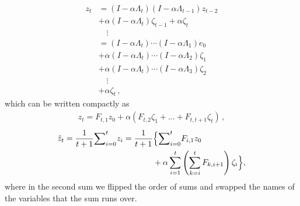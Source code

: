\begin{align*}
z_t
& = (I-\alpha \Lambda_t) (I-\alpha \Lambda_{t-1}) z_{t-2}\\ &+ \alpha (I-\alpha \Lambda_t) \zeta_{t-1} +\alpha \zeta_t \\
& \quad \vdots\\
& = (I-\alpha \Lambda_t) \cdots (I-\alpha \Lambda_1) e_0\\ &+ \alpha (I-\alpha \Lambda_t) \cdots (I-\alpha \Lambda_2) \zeta_1 \\
& + \alpha (I-\alpha \Lambda_t) \cdots (I-\alpha \Lambda_3) \zeta_2\\
&  \quad \vdots \\
&+ \alpha \zeta_t\,,
\end{align*}
which can be written compactly as
\begin{align}
\label{eq:etft}
z_t = F_{t,1} z_0 + \alpha (F_{t,2} \zeta_1 + \dots + F_{t,t+1} \zeta_t )\,,
\end{align}
\begin{align*}
\hat{z}_t=\frac{1}{t+1}{\sum}_{i=0}^{t}z_i
=\frac{1}{t+1}&\Big\{{\sum}_{i=0}^{t} F_{i,1} z_0 \\
&+ \alpha \sum_{i=1}^{t} \left(\sum_{k=i}^{t} F_{k,i+1} \right)\zeta_i \Big\} ,
\end{align*}
where in the second sum we flipped the order of sums and swapped the names of the variables that the sum runs over.

